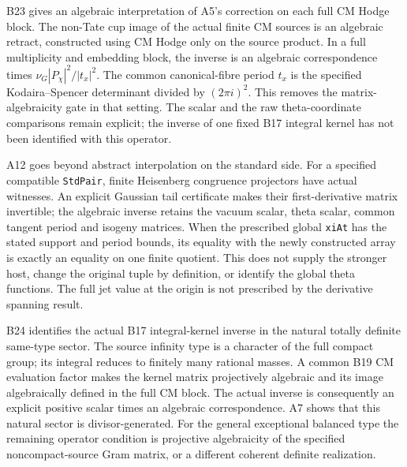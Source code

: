 \documentclass[11pt]{article}
\theoremstyle{definition}\newtheorem{definition}[theorem]{Definition}\newtheorem{remark}[theorem]{Remark}
\begin{document}
B23 gives an algebraic interpretation of A5's correction on
each full CM Hodge block. The non-Tate cup image of the actual
finite CM sources is an algebraic retract, constructed using
CM Hodge only on the source product. In a full multiplicity
and embedding block, the inverse is an algebraic correspondence
times $\nu_G|P_\chi|^2/|t_x|^2$. The common canonical-fibre
period $t_x$ is the specified Kodaira--Spencer determinant
divided by $(2\pi i)^2$. This removes the matrix-algebraicity
gate in that setting. The scalar and the raw theta-coordinate
comparisons remain explicit; the inverse of one fixed B17
integral kernel has not been identified with this operator.

A12 goes beyond abstract interpolation on the standard side.
For a specified compatible \texttt{StdPair}, finite
Heisenberg congruence projectors have actual
 witnesses. An explicit Gaussian
tail certificate makes their first-derivative matrix invertible;
the algebraic inverse retains the vacuum scalar, theta scalar,
common tangent period and isogeny matrices. When the prescribed
global \texttt{xiAt} has the stated support and period bounds,
its equality with the newly constructed array is exactly an
equality on one finite quotient. This does not supply the
stronger host, change the original tuple by definition, or
identify the global theta functions. The full jet value at
the origin is not prescribed by the derivative spanning result.

B24 identifies the actual B17 integral-kernel inverse in the
natural totally definite same-type sector. The source infinity
type is a character of the full compact group; its integral
reduces to finitely many rational masses. A common B19 CM
evaluation factor makes the kernel matrix projectively
algebraic and its image algebraically defined in the full CM
block. The actual inverse is consequently an explicit positive
scalar times an algebraic correspondence. A7 shows that this
natural sector is divisor-generated. For the general
exceptional balanced type the remaining operator condition is
projective algebraicity of the specified noncompact-source
Gram matrix, or a different coherent definite realization.
\end{document}
